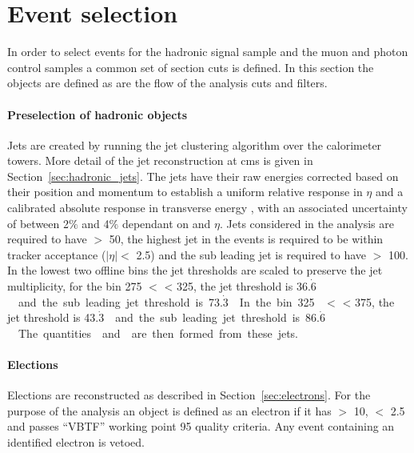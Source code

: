 
\section{Event selection} %
\label{sec:event_selection}
In order to select events for the hadronic signal sample and the muon and 
photon control samples a common set of section cuts is defined. In this section 
the objects are defined as are the flow of the analysis cuts and filters.

\paragraph{Preselection of hadronic objects} %
\label{par:Preselection_of_hadronic_objects}
Jets are created by running the \AK jet clustering 
algorithm\cite{Cacciari:2008ua} over the calorimeter towers. More detail of the 
jet reconstruction at \ac{cms} is given in Section~\ref{sec:hadronic_jets}. The 
jets have their raw energies corrected based on their position and momentum to 
establish a uniform relative response in $\eta$ and a calibrated absolute 
response in transverse energy \ET, with an associated uncertainty of between 
2$\%$ and 4$\%$ dependant on \ET and $\eta$\cite{Chatrchyan:2011ds}. Jets 
considered in the analysis are required to have \ET $>$ \unit{50}{\GeV}, the 
highest \ET jet in the events is required to be within tracker acceptance 
($|\eta| <$ 2.5) and the sub leading jet is required to have \ET $>$ 
\unit{100}{\GeV}. In the lowest two offline \HT bins the jet thresholds are scaled to preserve the jet multiplicity, for the bin \unit{275}{\GeV} $<$ \HT < \unit{325}{\GeV}, the jet threshold is \unit{36.$\dot{6}$}{\GeV} and the sub leading jet threshold is \unit{73.$\dot{3}$}{\GeV}. In the bin \unit{325}{\GeV} $<$ \HT < \unit{375}{\GeV}, the jet threshold is \unit{43.$\dot{3}$}{\GeV} and the sub leading jet threshold is \unit{86.$\dot{6}$}{\GeV}.

The quantities \HT and \HTm are then formed from these jets.

\paragraph{Elections} %
\label{par:elections}
Elections are reconstructed as described in Section~\ref{sec:electrons}. For 
the purpose of the analysis an object is defined as an electron if it has \PT 
$>$ \unit{10}{\GeV}, \mETA $<$ 2.5 and passes ``VBTF'' working point 95 quality 
criteria\cite{PAS-EGM-10-004}. Any event containing an identified electron is 
vetoed. 

